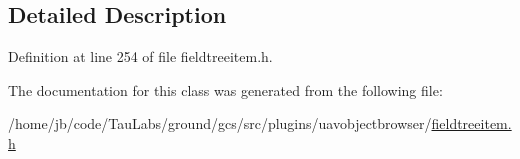 \subsection{\-Detailed \-Description}


\-Definition at line 254 of file fieldtreeitem.\-h.



\-The documentation for this class was generated from the following file\-:\begin{DoxyCompactItemize}
\item 
/home/jb/code/\-Tau\-Labs/ground/gcs/src/plugins/uavobjectbrowser/\hyperlink{fieldtreeitem_8h}{fieldtreeitem.\-h}\end{DoxyCompactItemize}
